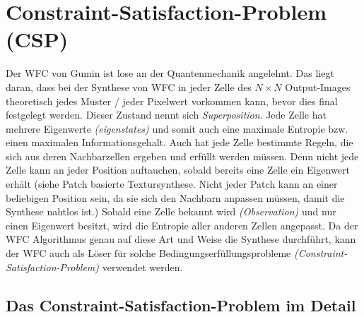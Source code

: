 \documentclass[12pt, a4paper,twoside,openright]{report} %
\begin{document}
\section{Constraint-Satisfaction-Problem {(CSP)}}

Der WFC von Gumin ist lose an der Quantenmechanik angelehnt.
Das liegt daran, dass bei der Synthese von WFC in jeder Zelle des $N\times N$ Output-Images theoretisch jedes Muster / jeder Pixelwert vorkommen kann, bevor dies final festgelegt werden.
Dieser Zustand nennt sich \textit{Superposition}.
Jede Zelle hat mehrere Eigenwerte \textit{(eigenstates)} und somit auch eine maximale Entropie bzw. einen maximalen Informationsgehalt.
Auch hat jede Zelle bestimmte Regeln, die sich aus deren Nachbarzellen ergeben und erfüllt werden müssen.
Denn nicht jede Zelle kann an jeder Position auftauchen, sobald bereits eine Zelle ein Eigenwert erhält
{(siehe Patch basierte Textursynthese. Nicht jeder Patch kann an einer beliebigen Position sein,
da sie sich den Nachbarn anpassen müssen, damit die Synthese nahtlos ist.)}
Sobald eine Zelle bekannt wird \textit{(Observation)} und nur einen Eigenwert besitzt,
wird die Entropie aller anderen Zellen angepasst.
 \cite[S.5, 2.2 The wave function]{Zinkernagel_2016}
Da der WFC Algorithmus genau auf diese Art und Weise die Synthese durchführt,
kann der WFC auch als Löser für solche Bedingungserfüllungsprobleme \textit{(Constraint-Satisfaction-Problem)} verwendet werden.

\subsection{Das Constraint-Satisfaction-Problem im Detail}
\end{document}

